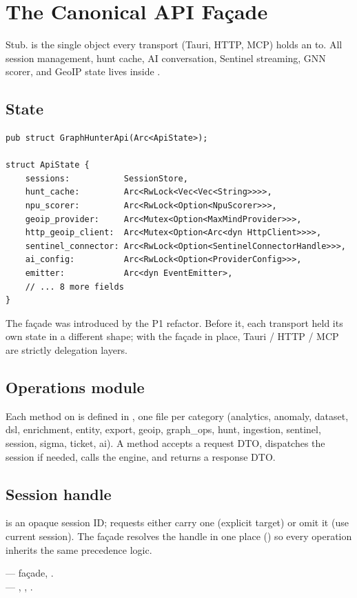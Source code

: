 \chapter{The Canonical API Façade}
\label{ch:api-facade}

\begin{note}
Stub.  is the single object every transport
(Tauri, HTTP, MCP) holds an  to. All session management,
hunt cache, AI conversation, Sentinel streaming, GNN scorer, and
GeoIP state lives inside .
\end{note}

\section{State}

\begin{lstlisting}[style=rust]
pub struct GraphHunterApi(Arc<ApiState>);

struct ApiState {
    sessions:           SessionStore,
    hunt_cache:         Arc<RwLock<Vec<Vec<String>>>>,
    npu_scorer:         Arc<RwLock<Option<NpuScorer>>>,
    geoip_provider:     Arc<Mutex<Option<MaxMindProvider>>>,
    http_geoip_client:  Arc<Mutex<Option<Arc<dyn HttpClient>>>>,
    sentinel_connector: Arc<RwLock<Option<SentinelConnectorHandle>>>,
    ai_config:          Arc<RwLock<Option<ProviderConfig>>>,
    emitter:            Arc<dyn EventEmitter>,
    // ... 8 more fields
}
\end{lstlisting}

The façade was introduced by the P1 refactor. Before it, each
transport held its own state in a different shape; with the façade
in place, Tauri / HTTP / MCP are strictly delegation layers.

\section{Operations module}

Each method on  is defined in
, one file per
category (analytics, anomaly, dataset, dsl, enrichment, entity,
export, geoip, graph\_ops, hunt, ingestion, sentinel, session,
sigma, ticket, ai). A method accepts a request DTO, dispatches the
session if needed, calls the engine, and returns a response DTO.

\section{Session handle}

 is an opaque session ID; requests
either carry one (explicit target) or omit it (use current
session). The façade resolves the handle in one place
() so every operation inherits the
same precedence logic.

\begin{inthecode}
 --- 
façade, .\\
 ---
, , .
\end{inthecode}
